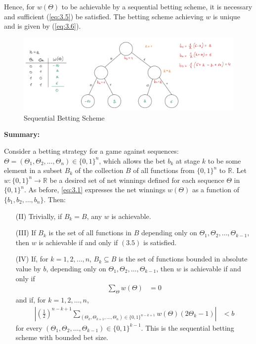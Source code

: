 \documentclass[11pt]{article}
\numberwithin{equation}{section}
\theoremstyle{boldStyle}
\begin{document}
Hence, for $w(\Theta)$ to be achievable by a sequential betting scheme, it is necessary and sufficient (\ref{eq:3.5}) be satisfied.
The betting scheme achieving \(w\) is unique and is given by (\ref{eq:3.6}).

\begin{figure}[H]
    \centering
    \includegraphics[width=\textwidth]{figs/achievable_winning.jpeg}
    \caption{Sequential Betting Scheme}
\end{figure}


\bigbreak

\textbf{Summary:}

Consider a betting strategy for a game against sequences: $\Theta = (\Theta_1, \Theta_2, \ldots, \Theta_n) \in \{0,1\}^n$, which allows the bet $b_k$ at stage $k$ to be some 
element in a subset $B_k$ of the collection $B$ of all functions from $\{0,1\}^n$ to $\mathbb{R}$. 
Let $w: \{0,1\}^n \rightarrow \mathbb{R}$ be a desired set of net winnings defined for each sequence $\Theta$ in $\{0,1\}^n$. 
As before, \ref{eq:3.1} expresses the net winnings $w(\Theta)$ as a function of $\{b_1, b_2, \ldots, b_n\}$. Then:

\begin{enumerate}
    \item[(II)] Trivially, if $B_k = B$, any $w$ is achievable.
    \item[(III)] If $B_k$ is the set of all functions in $B$ depending only on $\Theta_1, \Theta_2, \ldots, \Theta_{k-1}$, then $w$ is achievable if and only if $(3.5)$ is satisfied.
    \item[(IV)] If, for $k = 1, 2, \ldots, n$, $B_k \subseteq B$ is the set of functions bounded in absolute value by $b$, depending only on $\Theta_1, \Theta_2, \ldots, \Theta_{k-1}$, 
    then $w$ is achievable if and only if
    \begin{align} \label{eq:3.7}
        \sum_{\Theta} w(\Theta) &= 0 
    \end{align}
    and if, for $k = 1, 2, \ldots, n$,
    \begin{align} \label{eq:3.8}
        \left|\left(\frac{1}{2}\right)^{n-k+1} \sum_{(\Theta_k, \Theta_{k+1}, \ldots, \Theta_n) \in \{0,1\}^{n-k+1}} w(\Theta)(2\Theta_k - 1)\right| &< b 
    \end{align}
    for every $(\Theta_1, \Theta_2, \ldots, \Theta_{k-1}) \in \{0, 1\}^{k-1}$. This is the sequential betting scheme with bounded bet size.
\end{enumerate}
\end{document}
